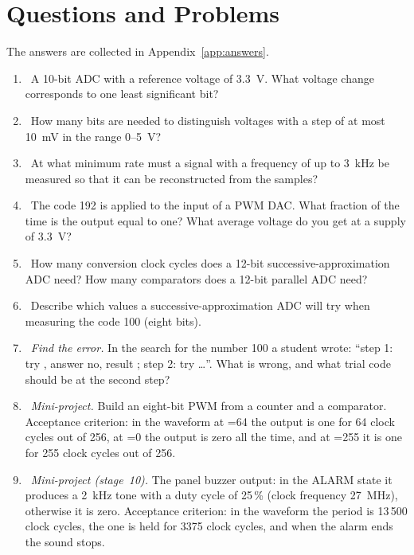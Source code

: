 \section{Questions and Problems}
\label{sec:tasks-analog}

The answers are collected in Appendix~\ref{app:answers}.

\begin{taskbox}
\begin{enumerate}
  \item {}~A 10-bit ADC with a reference voltage of 3.3~V. What voltage change
        corresponds to one least significant bit?
  \item {}~How many bits are needed to distinguish voltages with a step of at most
        10~mV in the range 0--5~V?
  \item {}~At what minimum rate must a signal with a frequency of
        up to 3~kHz be measured so that it can be reconstructed from the samples?
  \item {}~The code 192 is applied to the input of a PWM DAC. What fraction of the time is
        the output equal to one? What average voltage do you get at a supply of
        3.3~V?
  \item {}~How many conversion clock cycles does a 12-bit successive-approximation
        ADC need? How many comparators does a 12-bit parallel
        ADC need?
  \item {}~Describe which values a successive-approximation ADC will try
        when measuring the code 100 (eight bits).
  \item {}~\emph{Find the error.} In the search for the number 100 a student wrote:
        ``step 1: try , answer no, result ; step 2:
        try \ldots''. What is wrong, and what trial
        code should be at the second step?
  \item {}~\emph{Mini-project.} Build an eight-bit PWM from a counter and a
        comparator. Acceptance criterion: in the waveform at =64 the output
        is one for 64 clock cycles out of 256, at =0 the output is zero all the time,
        and at =255 it is one for 255 clock cycles out of 256.
  \item {}~\emph{Mini-project (stage~10).} The panel buzzer output: in the ALARM state
        it produces a 2~kHz tone with a duty cycle of 25\,\% (clock frequency
        27~MHz), otherwise it is zero. Acceptance criterion: in the waveform the period is
        13\,500 clock cycles, the one is held for 3375 clock cycles, and when the alarm ends
        the sound stops.
\end{enumerate}
\end{taskbox}

